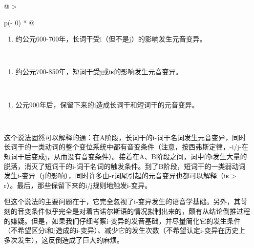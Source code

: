 {{\begin{longtable}[]{@{}
  >{\raggedright\arraybackslash}p{(\columnwidth - 0\tabcolsep) * }@{}}
  \toprule\noalign{}
  \begin{minipage}[b]{\linewidth}\raggedright
    \begin{enumerate}
      \def\labelenumi{\Alph{enumi}.}
      \item
            约公元600-700年，长词干受i（但不是j）的影响发生元音变异。
    \end{enumerate}
  \end{minipage} \\
  \midrule\noalign{}
  \endhead
  \bottomrule\noalign{}
  \endlastfoot
  \begin{minipage}[t]{\linewidth}\raggedright
    \begin{enumerate}
      \def\labelenumi{\Alph{enumi}.}
      \setcounter{enumi}{1}
      \item
            约公元700-850年，短词干受j或iʀ的影响发生元音变异。
    \end{enumerate}
  \end{minipage} \\
  \begin{minipage}[t]{\linewidth}\raggedright
    \begin{enumerate}
      \def\labelenumi{\Alph{enumi}.}
      \setcounter{enumi}{2}
      \item
            公元900年后，保留下来的i造成长词干和短词干的元音变异。
    \end{enumerate}
  \end{minipage} \\
\end{longtable}

这个说法固然可以解释的通：在A阶段，长词干的i-词干名词发生元音变异，同时长词干的一类动词的整个变位系统中都有音变条件（注意，按西弗斯定律，-i/j-在短词干后变成j，从而没有音变条件）。接着在A、B阶段之间，词中的i发生大量的脱落，消灭了短词干的i-词干名词的触发条件。到了B阶段，短词干的一类弱动词发生i-变异（j的影响），同时许多由-r词尾引起的元音变异也都可以解释（iʀ
\textgreater{} r）。最后，那些保留下来的i/j规则地触发i-变异。

但这个说法的主要问题在于，它完全忽视了i-变异发生的语音学基础。另外，其苛刻的音变条件似乎完全是对着古诺尔斯语的情况拟制出来的，颇有从结论倒推过程的嫌疑。但是，如果我们仔细考察i-变异的发音基础，并尽量简化它的发生条件（不希望区分i和j造成的i-变异）、减少它的发生次数（不希望认定i-变异在历史上多次发生），这反倒造成了巨大的麻烦。

}}
